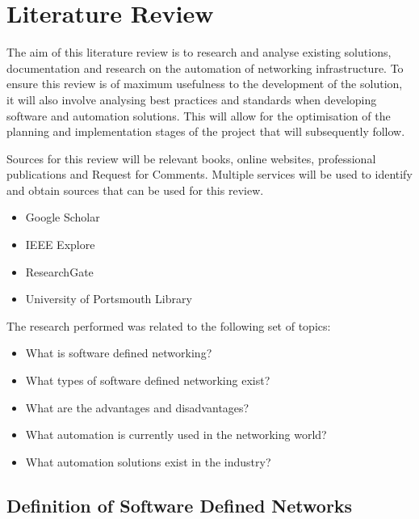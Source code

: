 \chapter{Literature Review}
\label{chap:litreview}
The aim of this literature
review is to research and analyse existing
solutions, documentation and
research on the automation of networking
infrastructure. To ensure this review
is of maximum usefulness to the development of the solution, it will also
involve analysing best practices and
standards when developing software and
automation solutions. This will allow
for the optimisation of the planning and
implementation stages of the project
that will subsequently follow.

Sources
for this review will be relevant
books, online websites,
professional
publications and Request for Comments.
Multiple services will be
used to
identify and obtain sources that can be used
for this review.
\begin{itemize}

      \item Google Scholar
      \item IEEE Explore
      \item ResearchGate
      \item University of Portsmouth Library
\end{itemize}
The research performed was related to the following set of
topics:
\begin{itemize}
      \item What is software defined networking?
      \item What types of software defined networking exist?
      \item What are the advantages and disadvantages?
      \item What automation is currently used in the networking world?
      \item What automation solutions exist in the industry?
\end{itemize}

\section{Definition of Software Defined Networks}
\label{litreview:definition}

